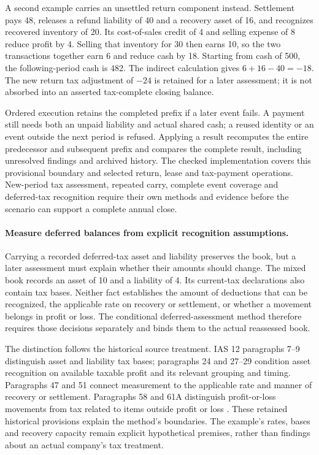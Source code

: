 A second example carries an unsettled return component instead. Settlement
pays 48, releases a refund liability of 40 and a recovery asset of 16, and
recognizes recovered inventory of 20. Its cost-of-sales credit of 4 and selling
expense of 8 reduce profit by 4. Selling that inventory for 30 then earns 10,
so the two transactions together earn 6 and reduce cash by 18. Starting from
cash of 500, the following-period cash is 482. The indirect calculation gives
$6+16-40=-18$. The new return tax adjustment of $-24$ is retained for a later
assessment; it is not absorbed into an asserted tax-complete closing balance.

Ordered execution retains the completed prefix if a later event fails. A
payment still needs both an unpaid liability and actual shared cash; a reused
identity or an event outside the next period is refused. Applying a result
recomputes the entire predecessor and subsequent prefix and compares the
complete result, including unresolved findings and archived history. The
checked implementation covers this provisional boundary and selected return,
lease and tax-payment operations. New-period tax assessment, repeated carry,
complete event coverage and deferred-tax recognition require their own methods
and evidence before the scenario can support a complete annual close.


\paragraph{Measure deferred balances from explicit recognition assumptions.}
Carrying a recorded deferred-tax asset and liability preserves the book, but a
later assessment must explain whether their amounts should change. The mixed
book records an asset of 10 and a liability of 4. Its current-tax declarations
also contain tax bases. Neither fact establishes the amount of deductions that
can be recognized, the applicable rate on recovery or settlement, or whether a
movement belongs in profit or loss. The conditional deferred-assessment method
therefore requires those decisions separately and binds them to the actual
reassessed book.

The distinction follows the historical source treatment. IAS 12 paragraphs 7--9
distinguish asset and liability tax bases; paragraphs 24 and 27--29 condition
asset recognition on available taxable profit and its relevant grouping and
timing. Paragraphs 47 and 51 connect measurement to the applicable rate and
manner of recovery or settlement. Paragraphs 58 and 61A distinguish profit-or-loss
movements from tax related to items outside profit or loss
\citep[IAS 12, paras. 7--9, 24, 27--29, 47, 51, 58 and 61A]{eu20231803}.
These retained historical provisions explain the method's boundaries. The
example's rates, bases and recovery capacity remain explicit hypothetical
premises, rather than findings about an actual company's tax treatment.

